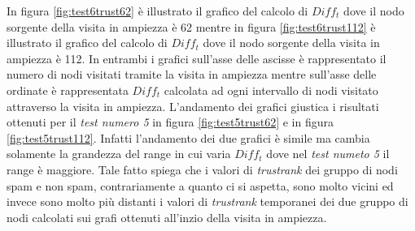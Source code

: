 In figura \ref{fig:test6trust62} è illustrato il grafico del calcolo di \(Diff_t\) dove il nodo sorgente della visita in ampiezza è 62 mentre in figura \ref{fig:test6trust112} è illustrato il grafico del calcolo di \(Diff_t\) dove il nodo sorgente della visita in ampiezza è 112. In entrambi i grafici sull'asse delle ascisse è rappresentato il numero di nodi visitati tramite la visita in ampiezza mentre sull'asse delle ordinate è rappresentata \(Diff_t\) calcolata ad ogni intervallo di nodi visitato attraverso la visita in ampiezza. L'andamento dei grafici giustica i risultati ottenuti per il \textit{test numero 5} in figura \ref{fig:test5trust62} e in figura \ref{fig:test5trust112}. Infatti l'andamento dei due grafici è simile ma cambia solamente la grandezza del range in cui varia \(Diff_t\) dove nel \textit{test numeto 5} il range è maggiore. Tale fatto spiega che i valori di \textit{trustrank} dei gruppo di nodi spam e non spam, contrariamente a quanto ci si aspetta, sono molto vicini ed invece sono molto 
più distanti i valori di \textit{trustrank} temporanei dei due gruppo di nodi calcolati sui grafi ottenuti all'inzio della visita in ampiezza. 

